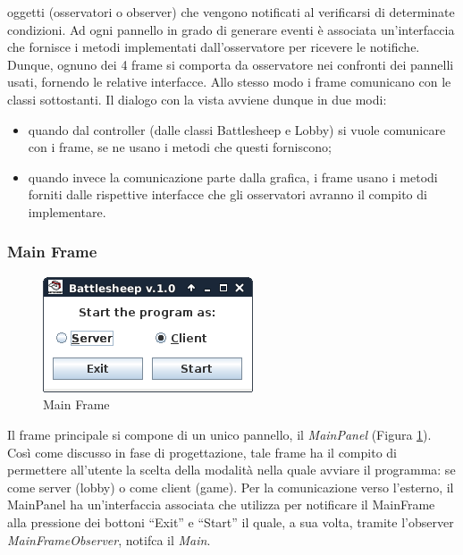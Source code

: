 oggetti (osservatori o observer) che vengono notificati
al verificarsi di determinate condizioni. Ad ogni pannello in grado di
generare eventi è associata un'interfaccia che fornisce i metodi implementati dall'osservatore per ricevere le notifiche.
Dunque, ognuno dei 4 frame si comporta da osservatore nei confronti dei pannelli usati, fornendo
le relative interfacce. Allo stesso modo i frame comunicano con le classi
sottostanti. Il dialogo con la vista avviene dunque in due modi:
\begin{itemize}
	\item quando dal controller (dalle classi Battlesheep e Lobby) si vuole comunicare con i frame, se ne usano i
	metodi che questi forniscono;
	\item quando invece la comunicazione parte dalla grafica, i frame usano i
	metodi forniti dalle rispettive interfacce che gli osservatori avranno il
	compito di implementare.
\end{itemize}



\subsubsection{Main Frame}
\begin{figure}[!h]
	\centering
	\includegraphics[scale=0.4]{core/imgs/gui/main_frame}
	\caption{Main Frame}
	\label{figure:main_frame}
\end{figure}
Il frame principale si compone di un unico pannello, il \textit{MainPanel} (Figura \ref{figure:main_frame}).
Così come discusso in fase di progettazione, tale frame ha il compito di
permettere all'utente la scelta della modalità nella quale avviare il programma:
se come server (lobby) o come client (game).\newline
Per la comunicazione verso l'esterno, il MainPanel ha un'interfaccia associata
che utilizza per notificare il MainFrame alla pressione dei bottoni ``Exit'' e
``Start'' il quale, a sua volta, tramite l'observer \textit{MainFrameObserver},
notifca il \textit{Main}.



